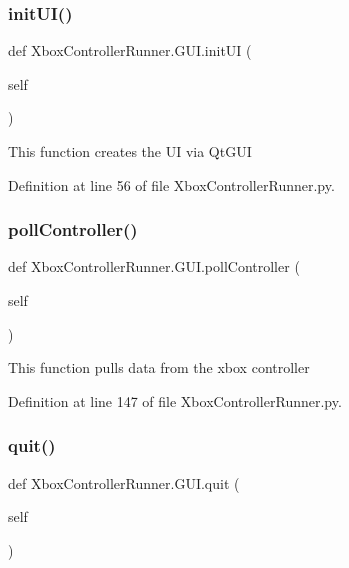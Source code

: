 \subsubsection{\texorpdfstring{init\+U\+I()}{initUI()}}
{\footnotesize\ttfamily def Xbox\+Controller\+Runner.\+G\+U\+I.\+init\+UI (\begin{DoxyParamCaption}\item[{}]{self }\end{DoxyParamCaption})}

\begin{DoxyVerb}This function creates the UI via QtGUI\end{DoxyVerb}
 

Definition at line 56 of file Xbox\+Controller\+Runner.\+py.

\mbox{\label{class_xbox_controller_runner_1_1_g_u_i_aadaff9485ea4ec6a5744197ccda8e9af}} 
\subsubsection{\texorpdfstring{poll\+Controller()}{pollController()}}
{\footnotesize\ttfamily def Xbox\+Controller\+Runner.\+G\+U\+I.\+poll\+Controller (\begin{DoxyParamCaption}\item[{}]{self }\end{DoxyParamCaption})}

\begin{DoxyVerb}This function pulls data from the xbox controller\end{DoxyVerb}
 

Definition at line 147 of file Xbox\+Controller\+Runner.\+py.

\mbox{\label{class_xbox_controller_runner_1_1_g_u_i_ab06e6a41c1d8afbd4a2378e2c5d68adc}} 
\subsubsection{\texorpdfstring{quit()}{quit()}}
{\footnotesize\ttfamily def Xbox\+Controller\+Runner.\+G\+U\+I.\+quit (\begin{DoxyParamCaption}\item[{}]{self }\end{DoxyParamCaption})}

